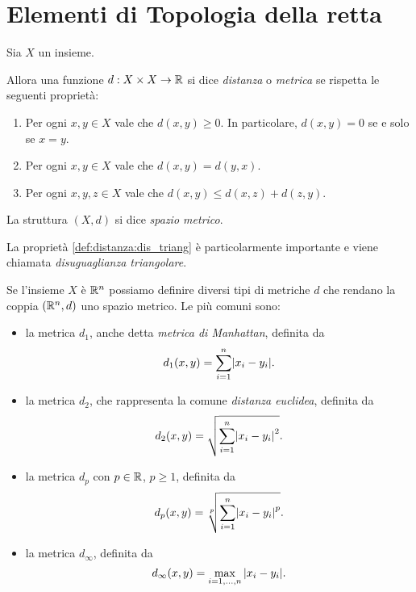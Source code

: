 \section{Elementi di Topologia della retta}

\begin{definition}
     \label{def:spazio_metrico}
    Sia $X$ un insieme. 
    
    Allora una funzione $d : X \times X \to \R$ si dice \emph{distanza} o \emph{metrica} se rispetta le seguenti proprietà:
    \begin{enumerate}[label={(d\arabic*)}, ref={(d\arabic*)}]
        \item \label{def:distanza:pos} Per ogni $x, y \in X$ vale che $d(x, y) \geq 0$. In particolare, $d(x, y) = 0$ se e solo se $x = y$.
        \item \label{def:distanza:simm} Per ogni $x, y \in X$ vale che $d(x, y) = d(y, x)$.
        \item \label{def:distanza:dis_triang} Per ogni $x, y, z \in X$ vale che $d(x, y) \leq d(x, z) + d(z, y)$.
    \end{enumerate}

    La struttura $(X, d)$ si dice \emph{spazio metrico}.
\end{definition}

La proprietà \ref{def:distanza:dis_triang} è particolarmente importante e viene chiamata \emph{disuguaglianza triangolare}.

Se l'insieme $X$ è $\R^n$ possiamo definire diversi tipi di metriche $d$ che rendano la coppia $(\R^n, d)$ uno spazio metrico. Le più comuni sono:
\begin{itemize}
    \item la metrica $d_1$, anche detta \emph{metrica di Manhattan}, definita da \[
        d_1(x, y) = \sum_{i = 1}^n \abs*{x_i - y_i}.    
    \]
    \item la metrica $d_2$, che rappresenta la comune \emph{distanza euclidea}, definita da \[
        d_2(x, y) = \sqrt{\sum_{i = 1}^n \abs*{x_i - y_i}^2}.   
    \]
    \item la metrica $d_p$ con $p \in \R$, $p \geq 1$, definita da \[
        d_p(x, y) = \sqrt[p]{\sum_{i = 1}^n \abs*{x_i - y_i}^p}.   
    \]
    \item la metrica $d_\infty$, definita da \[
        d_\infty(x, y) = \max_{i = 1, \dots, n} {\abs*{x_i - y_i}}.    
    \]
\end{itemize}

